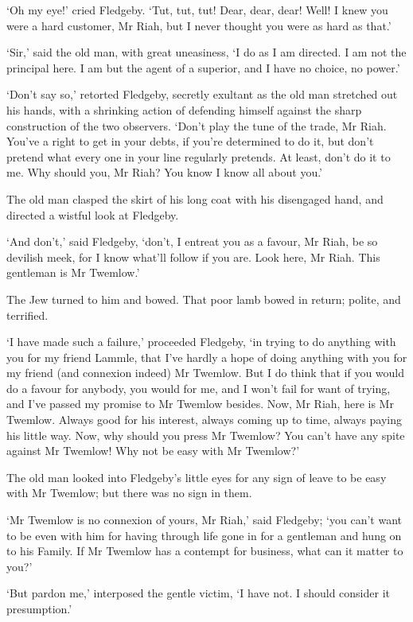 ‘Oh my eye!’ cried Fledgeby. ‘Tut, tut, tut! Dear, dear, dear! Well! I
knew you were a hard customer, Mr Riah, but I never thought you were as
hard as that.’

‘Sir,’ said the old man, with great uneasiness, ‘I do as I am directed.
I am not the principal here. I am but the agent of a superior, and I
have no choice, no power.’

‘Don’t say so,’ retorted Fledgeby, secretly exultant as the old man
stretched out his hands, with a shrinking action of defending himself
against the sharp construction of the two observers. ‘Don’t play the
tune of the trade, Mr Riah. You’ve a right to get in your debts, if
you’re determined to do it, but don’t pretend what every one in your
line regularly pretends. At least, don’t do it to me. Why should you, Mr
Riah? You know I know all about you.’

The old man clasped the skirt of his long coat with his disengaged hand,
and directed a wistful look at Fledgeby.

‘And don’t,’ said Fledgeby, ‘don’t, I entreat you as a favour, Mr Riah,
be so devilish meek, for I know what’ll follow if you are. Look here, Mr
Riah. This gentleman is Mr Twemlow.’

The Jew turned to him and bowed. That poor lamb bowed in return; polite,
and terrified.

‘I have made such a failure,’ proceeded Fledgeby, ‘in trying to do
anything with you for my friend Lammle, that I’ve hardly a hope of doing
anything with you for my friend (and connexion indeed) Mr Twemlow. But
I do think that if you would do a favour for anybody, you would for me,
and I won’t fail for want of trying, and I’ve passed my promise to Mr
Twemlow besides. Now, Mr Riah, here is Mr Twemlow. Always good for his
interest, always coming up to time, always paying his little way. Now,
why should you press Mr Twemlow? You can’t have any spite against Mr
Twemlow! Why not be easy with Mr Twemlow?’

The old man looked into Fledgeby’s little eyes for any sign of leave to
be easy with Mr Twemlow; but there was no sign in them.

‘Mr Twemlow is no connexion of yours, Mr Riah,’ said Fledgeby; ‘you
can’t want to be even with him for having through life gone in for a
gentleman and hung on to his Family. If Mr Twemlow has a contempt for
business, what can it matter to you?’

‘But pardon me,’ interposed the gentle victim, ‘I have not. I should
consider it presumption.’

